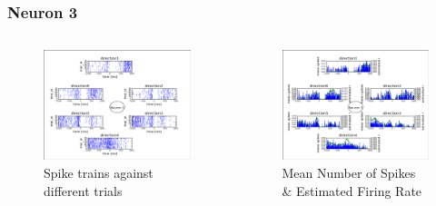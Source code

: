 \documentclass{beamer}
\begin{document}
\begin{frame}\frametitle{Neuron 3}
\begin{columns}
 \begin{column}{5cm}
  \begin{figure}
   \includegraphics[scale=0.25]{fig/neuron3spikes.png}
   \caption{Spike trains against different trials}
  \end{figure}
 \end{column}
 \begin{column}{5cm}
  \begin{figure}
   \includegraphics[scale=0.25]{fig/neuron3rates}
   \caption{Mean Number of Spikes \& Estimated Firing Rate}
  \end{figure}
 \end{column}
\end{columns}
\end{frame}
\end{document}
